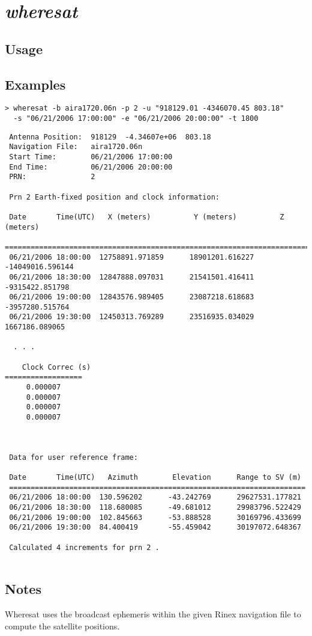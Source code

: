 %
%

\section{\emph{wheresat}}
\subsection{Usage}

\subsection{Examples}
\begin{\outputsize}
\begin{Verbatim}
> wheresat -b aira1720.06n -p 2 -u "918129.01 -4346070.45 803.18"
  -s "06/21/2006 17:00:00" -e "06/21/2006 20:00:00" -t 1800
\end{Verbatim}
\begin{Verbatim}
 Antenna Position:  918129  -4.34607e+06  803.18
 Navigation File:   aira1720.06n
 Start Time:        06/21/2006 17:00:00
 End Time:          06/21/2006 20:00:00
 PRN:               2

 Prn 2 Earth-fixed position and clock information:

 Date       Time(UTC)   X (meters)          Y (meters)          Z (meters)      
 ===============================================================================
 06/21/2006 18:00:00  12758891.971859      18901201.616227      -14049016.596144
 06/21/2006 18:30:00  12847888.097031      21541501.416411      -9315422.851798 
 06/21/2006 19:00:00  12843576.989405      23087218.618683      -3957280.515764 
 06/21/2006 19:30:00  12450313.769289      23516935.034029      1667186.089065  

  . . .

    Clock Correc (s)
==================
     0.000007
     0.000007
     0.000007
     0.000007

 

 Data for user reference frame:

 Date       Time(UTC)   Azimuth        Elevation      Range to SV (m)
 =====================================================================
 06/21/2006 18:00:00  130.596202      -43.242769      29627531.177821
 06/21/2006 18:30:00  118.680085      -49.681012      29983796.522429
 06/21/2006 19:00:00  102.845663      -53.888528      30169796.433699
 06/21/2006 19:30:00  84.400419       -55.459042      30197072.648367

 Calculated 4 increments for prn 2 .


\end{Verbatim}
\end{\outputsize}

\subsection{Notes}
Wheresat uses the broadcast ephemeris within the given Rinex navigation file to compute the satellite positions.

%

